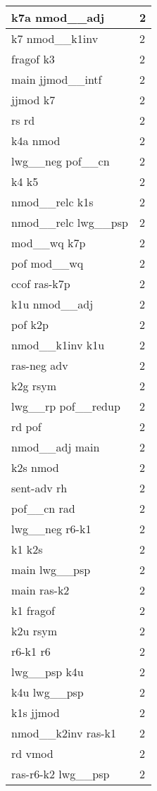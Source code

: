 \documentclass[a4 paper]{article}
\begin{document}
\begin{longtable}{p{}p{}}
k7a nmod\_\_adj  & 2 \\ \midrule
k7 nmod\_\_k1inv  & 2 \\ \midrule
fragof k3  & 2 \\ \midrule
main jjmod\_\_intf  & 2 \\ \midrule
jjmod k7  & 2 \\ \midrule
rs rd  & 2 \\ \midrule
k4a nmod  & 2 \\ \midrule
lwg\_\_neg pof\_\_cn  & 2 \\ \midrule
k4 k5  & 2 \\ \midrule
nmod\_\_relc k1s  & 2 \\ \midrule
nmod\_\_relc lwg\_\_psp  & 2 \\ \midrule
mod\_\_wq k7p  & 2 \\ \midrule
pof mod\_\_wq  & 2 \\ \midrule
ccof ras-k7p  & 2 \\ \midrule
k1u nmod\_\_adj  & 2 \\ \midrule
pof k2p  & 2 \\ \midrule
nmod\_\_k1inv k1u  & 2 \\ \midrule
ras-neg adv  & 2 \\ \midrule
k2g rsym  & 2 \\ \midrule
lwg\_\_rp pof\_\_redup  & 2 \\ \midrule
rd pof  & 2 \\ \midrule
nmod\_\_adj main  & 2 \\ \midrule
k2s nmod  & 2 \\ \midrule
sent-adv rh  & 2 \\ \midrule
pof\_\_cn rad  & 2 \\ \midrule
lwg\_\_neg r6-k1  & 2 \\ \midrule
k1 k2s  & 2 \\ \midrule
main lwg\_\_psp  & 2 \\ \midrule
main ras-k2  & 2 \\ \midrule
k1 fragof  & 2 \\ \midrule
k2u rsym  & 2 \\ \midrule
r6-k1 r6  & 2 \\ \midrule
lwg\_\_psp k4u  & 2 \\ \midrule
k4u lwg\_\_psp  & 2 \\ \midrule
k1s jjmod  & 2 \\ \midrule
nmod\_\_k2inv ras-k1  & 2 \\ \midrule
rd vmod  & 2 \\ \midrule
ras-r6-k2 lwg\_\_psp  & 2 \\ \midrule

\end{longtable}
\end{document}
